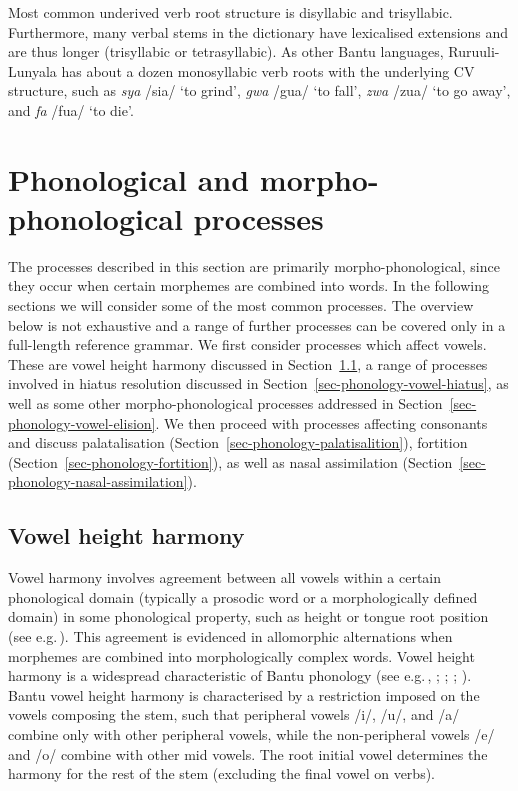 Most common underived verb root structure is disyllabic and trisyllabic. 
Furthermore, many verbal stems in the dictionary have lexicalised extensions and are thus longer (trisyllabic or tetrasyllabic). 
As other Bantu languages, Ruruuli-Lunyala has about a dozen monosyllabic verb roots with the underlying CV structure, such as  \textit{sya} /sia/ `to grind',  \textit{gwa} /gua/ `to fall',  \textit{zwa} /zua/ `to go away', and  \textit{fa} /fua/ `to die'.


\section{Phonological and morpho-phonological processes}\label{sec-morphophonological-process}

The processes described in this section are primarily morpho-pho\-no\-lo\-gi\-cal, since they occur when certain morphemes are combined into words. 
In the following sections we will consider some of the most common processes. 
The overview below is not exhaustive and a range of further processes can be covered only in a full-length reference grammar. 
We first consider processes which affect vowels. 
These are vowel height harmony discussed in Section~\ref{sec-phonology-vowel-harmony}, a range of processes involved in hiatus resolution discussed in Section~\ref{sec-phonology-vowel-hiatus}, as well as some other morpho-phonological processes addressed in Section~\ref{sec-phonology-vowel-elision}. 
We then proceed with processes affecting consonants and discuss palatalisation (Section~\ref{sec-phonology-palatisalition}), fortition (Section~\ref{sec-phonology-fortition}), as well as nasal assimilation (Section~\ref{sec-phonology-nasal-assimilation}).

\subsection{Vowel height harmony}\label{sec-phonology-vowel-harmony}

Vowel harmony involves agreement between all vowels within a certain phonological domain (typically a prosodic word or a morphologically defined domain) in some phonological property, such as height or tongue root position (see e.g.\,\citealt{vanderHulstetal1995Vowel}). 
This agreement is evidenced in allomorphic alternations when morphemes are combined into morphologically complex words.
Vowel height harmony is a widespread characteristic of Bantu phonology (see e.g.\,\citealt{Hyman1999Historical}, \citeyear{Hyman2019Segmental}; \citealt{Odden2015Bantu}; \citealt[70]{Downingetal2017Phonology}; \citealt{Lionnetetal2018Languages}). 
Bantu vowel height harmony is characterised by a restriction imposed on the vowels composing the stem, such that peripheral vowels /i/, /u/, and /a/ combine only with other peripheral vowels, while the non-peripheral vowels /e/ and /o/ combine with other mid vowels. 
The root initial vowel determines the harmony for the rest of the stem (excluding the final vowel on verbs). 

